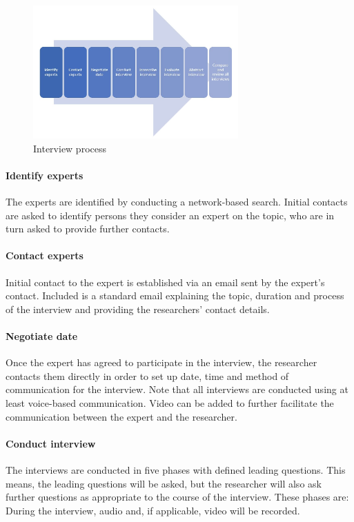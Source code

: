\documentclass[  12pt,
titlepage,
parskip,
draft=false,
headsepline=true,
footsepline=true,
captions=tableheading]{scrartcl}
\begin{document}
\begin{figure}[htb]
	\centering
	\includegraphics[width=0.7\textwidth]{Pictures/Interview_process}
	\caption{Interview process}
	\label{fig:Intprocess}
\end{figure}

\paragraph{Identify experts} The experts are identified by conducting a network-based search. Initial contacts are asked to identify persons they consider an expert on the topic, who are in turn asked to provide further contacts.
\paragraph{Contact experts} Initial contact to the expert is established via an email sent by the expert's contact. Included is a standard email explaining the topic, duration and process of the interview and providing the researchers' contact details.
\paragraph{Negotiate date} Once the expert has agreed to participate in the interview, the researcher contacts them directly in order to set up date, time and method of communication for the interview. Note that all interviews are conducted using at least voice-based communication. Video can be added to further facilitate the communication between the expert and the researcher.
\paragraph{Conduct interview} The interviews are conducted in five phases with defined leading questions. This means, the leading questions will be asked, but the researcher will also ask further questions as appropriate to the course of the interview. These phases are:
During the interview, audio and, if applicable, video will be recorded.
\end{document}
